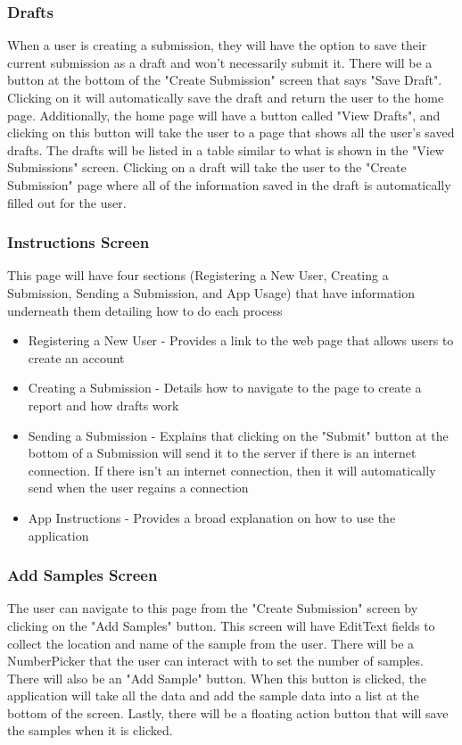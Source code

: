 \documentclass[onecolumn, draftclsnofoot,10pt, compsoc]{IEEEtran}
\begin{document}
\subsubsection{Drafts}
When a user is creating a submission, they will have the option to save their current submission as a draft and won't necessarily submit it. There will be a button at the bottom of the "Create Submission" screen that says "Save Draft". Clicking on it will automatically save the draft and return the user to the home page. Additionally, the home page will have a button called "View Drafts", and clicking on this button will take the user to a page that shows all the user's saved drafts. The drafts will be listed in a table similar to what is shown in the "View Submissions" screen. Clicking on a draft will take the user to the "Create Submission" page where all of the information saved in the draft is automatically filled out for the user.

\subsubsection{Instructions Screen}
This page will have four sections (Registering a New User, Creating a Submission, Sending a Submission, and App Usage) that have information underneath them detailing how to do each process
\begin{itemize}

\item Registering a New User - Provides a link to the web page that allows users to create an account
\item Creating a Submission - Details how to navigate to the page to create a report and how drafts work 
\item Sending a Submission - Explains that clicking on the "Submit" button at the bottom of a Submission will send it to the server if there is an internet connection. If there isn't an internet connection, then it will automatically send when the user regains a connection 
\item App Instructions - Provides a broad explanation on how to use the application
\end{itemize}

\subsubsection{Add Samples Screen}
The user can navigate to this page from the "Create Submission" screen by clicking on the "Add Samples" button. This screen will have EditText fields to collect the location and name of the sample from the user. There will be a NumberPicker that the user can interact with to set the number of samples. There will also be an "Add Sample" button. When this button is clicked, the application will take all the data and add the sample data into a list at the bottom of the screen. Lastly, there will be a floating action button that will save the samples when it is clicked.
\end{document}
